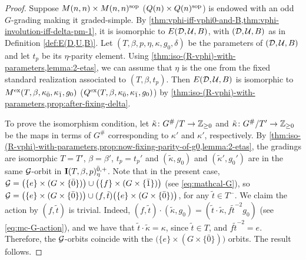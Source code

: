 \begin{proof}
    Suppose $M(n,n) \times M(n,n)^{\mathrm{sop}}$ ($Q(n) \times Q(n)^{\mathrm{sop}}$) is endowed with an odd $G$-grading making it graded-simple. 
    By \cref{thm:vphi-iff-vphi0-and-B,thm:vphi-involution-iff-delta-pm-1}, it is isomorphic to $E(\mathcal{D}, \mathcal U, B)$, with $(\mathcal{D}, \mathcal U, B)$ as in Definition \ref{def:E(D,U,B)}. 
    Let $(T, \beta, p, \eta, \kappa, g_0, \delta)$ be the parameters of $(\mathcal{D}, \mathcal U, B)$ and let $t_p$ be its $\eta$-parity element. 
    Using \cref{thm:iso-(R-vphi)-with-parameters,lemma:2-etas}, we can assume that $\eta$ is the one from the fixed standard realization associated to $(T, \beta, t_p)$. 
    Then $E(\mathcal{D}, \mathcal U, B)$ is isomorphic to $M^{\mathrm{ex}} (T, \beta, \kappa_{\bar{0}}, \kappa_{\bar{1}}, g_0)$ ($Q^{\mathrm{ex}} (T, \beta, \kappa_{\bar{0}}, \kappa_{\bar{1}}, g_0)$) by \cref{thm:iso-(R-vphi)-with-parameters,prop:after-fixing-delta}. 
    
    To prove the isomorphism condition, let  $\tilde\kappa\colon G^\#/T \to \mathbb{Z}_{\geq 0}$ and  $\tilde\kappa\colon G^\#/T' \to \mathbb{Z}_{\geq 0}$ be the maps in terms of $G^\#$ corresponding to $\kappa'$ and $\kappa'$, respectively. 
    By \cref{thm:iso-(R-vphi)-with-parameters,prop:now-fixing-parity-of-g0,lemma:2-etas}, the gradings are isomorphic \IFF $T =T'$, $\beta = \beta'$, $t_p = t_p'$ and $(\tilde\kappa, g_0)$ and $(\tilde\kappa', g_0')$ are in the same $\mathcal G$-orbit in $\mathbf{I}(T,\beta,p)^{{\bar{0}}, +}_\eta$. 
    Note that in the present case, $\mathcal G = \big( \{e\} \times (G \times \{ \bar 0 \}) \big) \cup \big( \{f\} \times (G \times \{ \bar 1 \}) \big)$ (see \cref{eq:mathcal-G}), so 
    $\mathcal G = \big( \{e\} \times (G \times \{ \bar 0 \}) \big) \cup (f, \tilde t)\big( \{e\} \times (G \times \{ \bar 0 \}) \big)$, for any $\tilde t \in T^-$. 
    We claim the action by $(f, \tilde t)$ is trivial. 
    Indeed, $(f, \tilde t) \cdot (\tilde\kappa, g_0) = (\tilde t \cdot \tilde\kappa, f \tilde t ^{-2} g_0)$ (see \cref{eq:mc-G-action}), and we have that $\tilde t \cdot \tilde\kappa = \kappa$, since $\tilde t \in T$, and $f \tilde t ^{-2} = e$. 
    Therefore, the $\mathcal G$-orbits coincide with the $\big( \{e\} \times (G \times \{ \bar 0 \}) \big)$ orbits. 
    The result follows. 
\end{proof}

